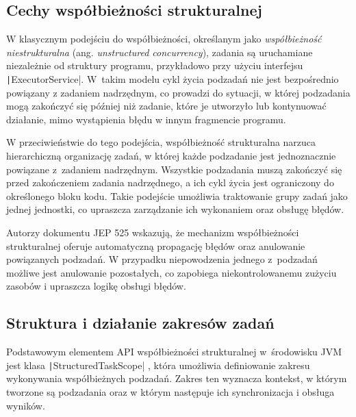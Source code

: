 \subsection{Cechy współbieżności strukturalnej}
W klasycznym podejściu do współbieżności, określanym jako \emph{współbieżność niestrukturalna} (ang. \emph{unstructured concurrency}), zadania są uruchamiane niezależnie od struktury programu, przykładowo przy użyciu interfejsu \texttt|ExecutorService|. W~takim modelu cykl życia podzadań nie jest bezpośrednio powiązany z zadaniem nadrzędnym, co prowadzi do sytuacji, w której podzadania mogą zakończyć się później niż zadanie, które je utworzyło lub kontynuować działanie, mimo wystąpienia błędu w innym fragmencie programu.

W przeciwieństwie do tego podejścia, współbieżność strukturalna narzuca hierarchiczną organizację zadań, w której każde podzadanie jest jednoznacznie powiązane z~zadaniem nadrzędnym. Wszystkie podzadania muszą zakończyć się przed zakończeniem zadania nadrzędnego, a ich cykl życia jest ograniczony do określonego bloku kodu. Takie podejście umożliwia traktowanie grupy zadań jako jednej jednostki, co upraszcza zarządzanie ich wykonaniem oraz obsługę błędów. \cite{veen2024}


Autorzy dokumentu JEP 525 \cite{jep525} wskazują, że mechanizm współbieżności strukturalnej oferuje automatyczną propagację błędów oraz anulowanie powiązanych podzadań. W przypadku niepowodzenia jednego z~podzadań możliwe jest anulowanie pozostałych, co zapobiega niekontrolowanemu zużyciu zasobów i upraszcza logikę obsługi błędów.

\subsection{Struktura i działanie zakresów zadań}
Podstawowym elementem API współbieżności strukturalnej w~środowisku JVM jest klasa \texttt|StructuredTaskScope| \cite{java-structured-task-scope}, która umożliwia definiowanie zakresu wykonywania współbieżnych podzadań. Zakres ten wyznacza kontekst, w którym tworzone są podzadania oraz w którym następuje ich synchronizacja i obsługa wyników.

